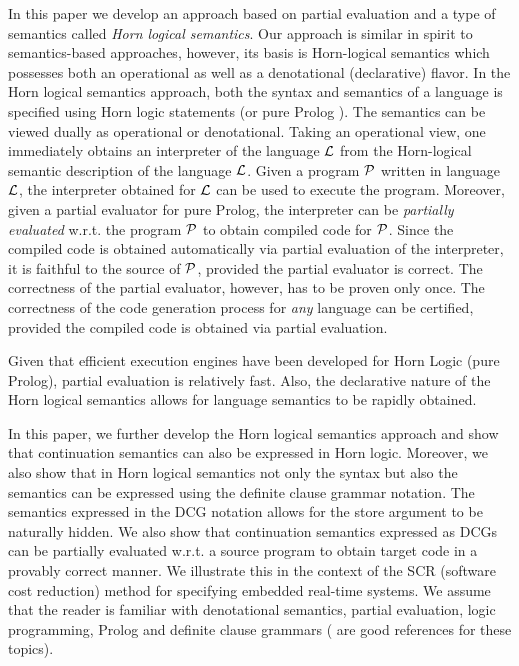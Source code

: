 \documentclass{entcs}
\begin{document}
In this paper we develop an approach based on partial evaluation 
and a type of semantics called {\it Horn logical semantics}.
Our approach is similar in spirit to semantics-based
approaches, however, its basis is Horn-logical
semantics \cite{logden} which possesses 
both an operational as well as 
a denotational (declarative) flavor. 
In the Horn logical semantics approach, both
the syntax and semantics of a language is specified
using Horn logic statements (or pure Prolog \cite{prolog}). The
semantics can be viewed dually as operational or 
denotational. Taking
an operational view, one immediately obtains an
interpreter of the language ${\cal L}$ 
from the Horn-logical semantic description of 
the language ${\cal L}$. Given a program ${\cal P}$ written
in language ${\cal L}$, the interpreter obtained for ${\cal L}$ 
can be used to execute the program. Moreover, given
a partial evaluator for pure Prolog, the interpreter
can be {\it partially evaluated} w.r.t. the program
${\cal P}$ to obtain compiled code for ${\cal P}$.
Since the compiled code is obtained automatically
via partial evaluation of the interpreter, it is
faithful to the source of ${\cal P}$, provided
the partial evaluator is correct.
The correctness of the partial
evaluator, however, has to be proven only once. The
correctness of the code generation process 
for {\it any} language can be certified, provided the
compiled code is obtained via partial evaluation.

Given that efficient execution engines  have been developed for Horn
Logic (pure Prolog), partial evaluation is relatively fast. Also, 
the declarative nature of the Horn logical semantics allows for
language semantics to be rapidly obtained.

In this paper, we further develop the Horn logical semantics approach
and show that continuation semantics can also be expressed in Horn logic.
Moreover, we also show that in Horn logical semantics not only the
syntax but also the semantics can be expressed using the definite
clause grammar notation. The semantics expressed in the DCG notation
allows for the store argument to be naturally hidden. We also show
that continuation semantics expressed as DCGs can be partially evaluated
w.r.t. a source program to obtain target
code in a provably correct manner.
We illustrate this in the context
of the SCR (software cost reduction) method for specifying
embedded real-time systems.
We assume that
the reader is familiar with denotational semantics,
partial evaluation, logic programming,
Prolog and definite clause grammars (\cite{schmidt,jones,prolog}
are good references for these topics).
\end{document}
